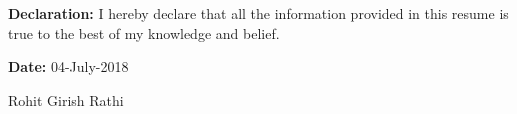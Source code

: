 \documentclass[11pt]{article}
\begin{document}
\begin{center}
		\linebreak\linebreak\linebreak\linebreak
		\textbf{Declaration:} I hereby declare that all the information provided in this resume is true to the best of my knowledge and belief.\linebreak\linebreak\linebreak
		\begin{minipage}[t]{0.5\textwidth}
			\raggedright
			\textbf{Date:} 04-July-2018
		\end{minipage}%
		\begin{minipage}[t]{0.5\textwidth}
			\raggedleft
			Rohit Girish Rathi
		\end{minipage}%
	\end{center}
\end{document}
